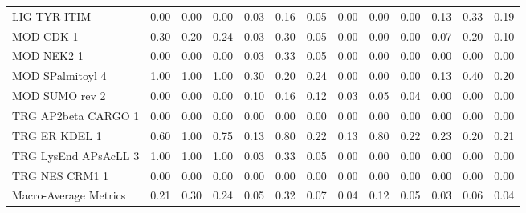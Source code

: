 \begin{tabular}{lrrrrrrrrrrrr}
LIG TYR ITIM          &  0.00 &  0.00 &  0.00 &  0.03 &  0.16 &  0.05 &  0.00 &  0.00 &  0.00 &  0.13 &  0.33 &  0.19 \\
MOD CDK 1             &  0.30 &  0.20 &  0.24 &  0.03 &  0.30 &  0.05 &  0.00 &  0.00 &  0.00 &  0.07 &  0.20 &  0.10 \\
MOD NEK2 1            &  0.00 &  0.00 &  0.00 &  0.03 &  0.33 &  0.05 &  0.00 &  0.00 &  0.00 &  0.00 &  0.00 &  0.00 \\
MOD SPalmitoyl 4      &  1.00 &  1.00 &  1.00 &  0.30 &  0.20 &  0.24 &  0.00 &  0.00 &  0.00 &  0.13 &  0.40 &  0.20 \\
MOD SUMO rev 2        &  0.00 &  0.00 &  0.00 &  0.10 &  0.16 &  0.12 &  0.03 &  0.05 &  0.04 &  0.00 &  0.00 &  0.00 \\
TRG AP2beta CARGO 1   &  0.00 &  0.00 &  0.00 &  0.00 &  0.00 &  0.00 &  0.00 &  0.00 &  0.00 &  0.00 &  0.00 &  0.00 \\
TRG ER KDEL 1         &  0.60 &  1.00 &  0.75 &  0.13 &  0.80 &  0.22 &  0.13 &  0.80 &  0.22 &  0.23 &  0.20 &  0.21 \\
TRG LysEnd APsAcLL 3  &  1.00 &  1.00 &  1.00 &  0.03 &  0.33 &  0.05 &  0.00 &  0.00 &  0.00 &  0.00 &  0.00 &  0.00 \\
TRG NES CRM1 1        &  0.00 &  0.00 &  0.00 &  0.00 &  0.00 &  0.00 &  0.00 &  0.00 &  0.00 &  0.00 &  0.00 &  0.00 \\
Macro-Average Metrics &  0.21 &  0.30 &  0.24 &  0.05 &  0.32 &  0.07 &  0.04 &  0.12 &  0.05 &  0.03 &  0.06 &  0.04 \\
\bottomrule
\end{tabular}
